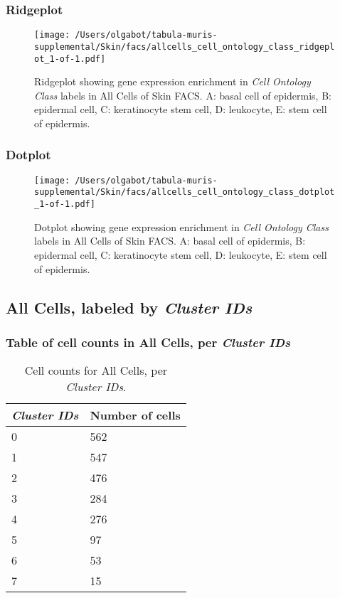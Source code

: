 \subsubsection{Ridgeplot}
\begin{figure}[h]
\centering
\texttt{[image: /Users/olgabot/tabula-muris-supplemental/Skin/facs/allcells\_cell\_ontology\_class\_ridgeplot\_1-of-1.pdf]}

\caption{ Ridgeplot  showing gene expression enrichment in \emph{Cell Ontology Class} labels in All Cells of Skin FACS. A: basal cell of epidermis, B: epidermal cell, C: keratinocyte stem cell, D: leukocyte, E: stem cell of epidermis.}
\end{figure}


\clearpage

\subsubsection{Dotplot}
\begin{figure}[h]
\centering
\texttt{[image: /Users/olgabot/tabula-muris-supplemental/Skin/facs/allcells\_cell\_ontology\_class\_dotplot\_1-of-1.pdf]}

\caption{ Dotplot  showing gene expression enrichment in \emph{Cell Ontology Class} labels in All Cells of Skin FACS. A: basal cell of epidermis, B: epidermal cell, C: keratinocyte stem cell, D: leukocyte, E: stem cell of epidermis.}
\end{figure}


\clearpage

\subsection{All Cells, labeled by \emph{Cluster IDs}}
\subsubsection{Table of cell counts in All Cells, per \emph{Cluster IDs}}\begin{table}[h]
\centering
\label{my-label}
\begin{tabular}{@{}ll@{}}
\toprule

\emph{Cluster IDs}& Number of cells \\ \midrule
0 & 562 \\

1 & 547 \\

2 & 476 \\

3 & 284 \\

4 & 276 \\

5 & 97 \\

6 & 53 \\

7 & 15 \\
\bottomrule
\end{tabular}
\caption{Cell counts for All Cells, per \emph{Cluster IDs}.}
\end{table}

